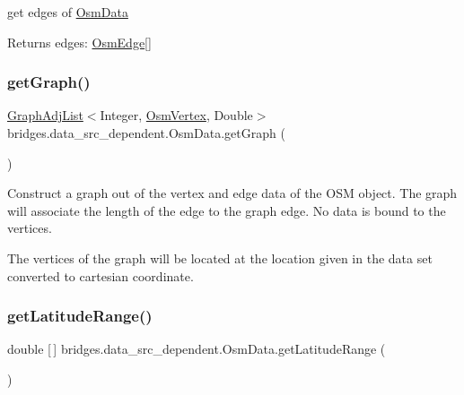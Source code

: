 get edges of \hyperlink{classbridges_1_1data__src__dependent_1_1_osm_data}{Osm\+Data} \begin{DoxyReturn}{Returns}
edges\+: \hyperlink{classbridges_1_1data__src__dependent_1_1_osm_edge}{Osm\+Edge}\mbox{[}\mbox{]} 
\end{DoxyReturn}
\mbox{\label{classbridges_1_1data__src__dependent_1_1_osm_data_a4f5282b7b11ef6e4a248a05c35fe3787}} 
\subsubsection{\texorpdfstring{get\+Graph()}{getGraph()}}
{\footnotesize\ttfamily \hyperlink{classbridges_1_1base_1_1_graph_adj_list}{Graph\+Adj\+List}$<$Integer, \hyperlink{classbridges_1_1data__src__dependent_1_1_osm_vertex}{Osm\+Vertex}, Double$>$ bridges.\+data\+\_\+src\+\_\+dependent.\+Osm\+Data.\+get\+Graph (\begin{DoxyParamCaption}{ }\end{DoxyParamCaption})}

Construct a graph out of the vertex and edge data of the O\+SM object. The graph will associate the length of the edge to the graph edge. No data is bound to the vertices.

The vertices of the graph will be located at the location given in the data set converted to cartesian coordinate. \mbox{\label{classbridges_1_1data__src__dependent_1_1_osm_data_a406042fe56541f04c059a1f1ec887c81}} 
\subsubsection{\texorpdfstring{get\+Latitude\+Range()}{getLatitudeRange()}}
{\footnotesize\ttfamily double \mbox{[}$\,$\mbox{]} bridges.\+data\+\_\+src\+\_\+dependent.\+Osm\+Data.\+get\+Latitude\+Range (\begin{DoxyParamCaption}{ }\end{DoxyParamCaption})}

